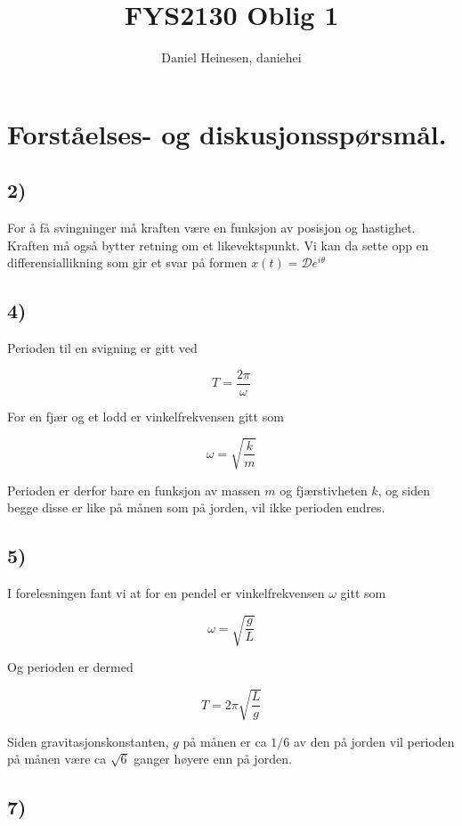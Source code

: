 \documentclass[a4paper,norsk, 10pt]{article}
\title{FYS2130 Oblig 1}
\author{Daniel Heinesen, daniehei}
\begin{document}
\maketitle

\section*{Forståelses- og diskusjonsspørsmål.}

\subsection*{2)}
For å få svingninger må kraften være en funksjon av posisjon og hastighet. Kraften må også bytter retning om et likevektspunkt. Vi kan da sette opp en differensiallikning som gir et svar på formen $x(t) = \mathcal{D}e^{i\theta}$

\subsection*{4)}
Perioden til en svigning er gitt ved

\begin{equation}
T = \frac{2\pi}{\omega}
\end{equation}

For en fjær og et lodd er vinkelfrekvensen gitt som

$$
\omega = \sqrt{\frac{k}{m}}
$$

Perioden er derfor bare en funksjon av massen $m$ og fjærstivheten $k$, og siden begge disse er like på månen som på jorden, vil ikke perioden endres.

\subsection*{5)}

I forelesningen fant vi at for en pendel er vinkelfrekvensen $\omega$ gitt som

$$
\omega = \sqrt{\frac{g}{L}}
$$


Og perioden er dermed

$$
T = 2\pi \sqrt{\frac{L}{g}}
$$

Siden gravitasjonskonstanten, $g$ på månen er ca $1/6$ av den på jorden vil perioden på månen være ca $\sqrt{6}$ ganger høyere enn på jorden.

\subsection*{7)}
\end{document}
